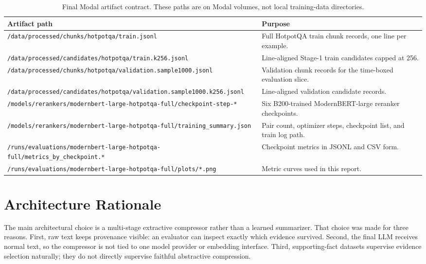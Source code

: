 \documentclass[10pt,twocolumn]{article}
\begin{document}
\begin{table}[t]
\centering
\small
\begin{tabular}{p{}p{}}
\toprule
Artifact path & Purpose\\
\midrule
\texttt{/data/processed/chunks/hotpotqa/}\newline\texttt{train.jsonl} & Full HotpotQA train chunk records, one line per example.\\
\texttt{/data/processed/candidates/hotpotqa/}\newline\texttt{train.k256.jsonl} & Line-aligned Stage-1 train candidates capped at 256.\\
\texttt{/data/processed/chunks/hotpotqa/}\newline\texttt{validation.sample1000.jsonl} & Validation chunk records for the time-boxed evaluation slice.\\
\texttt{/data/processed/candidates/hotpotqa/}\newline\texttt{validation.sample1000.k256.jsonl} & Line-aligned validation candidate records.\\
\texttt{/models/rerankers/}\newline\texttt{modernbert-large-hotpotqa-full/}\newline\texttt{checkpoint-step-*} & Six B200-trained ModernBERT-large reranker checkpoints.\\
\texttt{/models/rerankers/}\newline\texttt{modernbert-large-hotpotqa-full/}\newline\texttt{training\_summary.json} & Pair count, optimizer steps, checkpoint list, and train log path.\\
\texttt{/runs/evaluations/}\newline\texttt{modernbert-large-hotpotqa-full/}\newline\texttt{metrics\_by\_checkpoint.*} & Checkpoint metrics in JSONL and CSV form.\\
\texttt{/runs/evaluations/}\newline\texttt{modernbert-large-hotpotqa-full/plots/*.png} & Metric curves used in this report.\\
\bottomrule
\end{tabular}
\caption{Final Modal artifact contract. These paths are on Modal volumes, not local training-data directories.}
\label{tab:artifacts}
\end{table}

\section{Architecture Rationale}
The main architectural choice is a multi-stage extractive compressor rather than a learned summarizer. That choice was made for three reasons. First, raw text keeps provenance visible: an evaluator can inspect exactly which evidence survived. Second, the final LLM receives normal text, so the compressor is not tied to one model provider or embedding interface. Third, supporting-fact datasets supervise evidence selection naturally; they do not directly supervise faithful abstractive compression.
\end{document}
